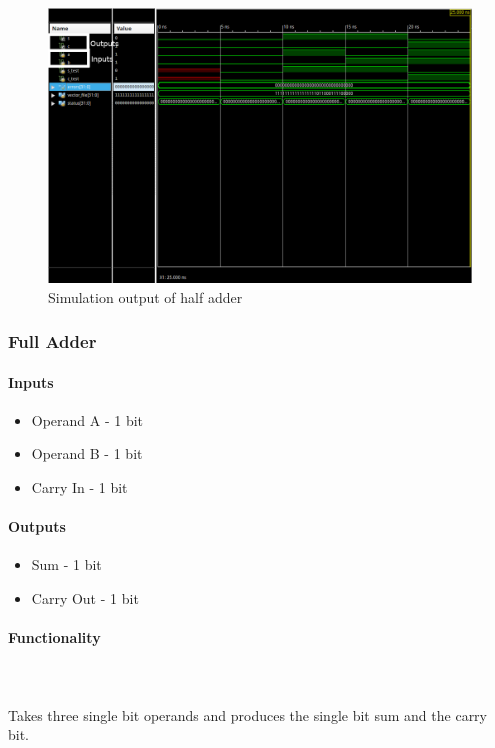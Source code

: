 \documentclass{article}
\begin{document}
    \begin{figure}[H]
        \centering
        \includegraphics[width=0.9\paperwidth,center]{Screenshots/half_adder.png}
        \caption{Simulation output of half adder}
    \end{figure}




    \subsubsection{Full Adder}

    \paragraph{Inputs}
    \begin{itemize}
        \item Operand A - 1 bit
        \item Operand B - 1 bit
        \item Carry In - 1 bit
    \end{itemize}

    \paragraph{Outputs}
    \begin{itemize}
        \item Sum - 1 bit
        \item Carry Out - 1 bit
    \end{itemize}

    \paragraph{Functionality}
    \hfill\\\\
    Takes three single bit operands and produces the single bit sum and the
    carry bit.
\end{document}
